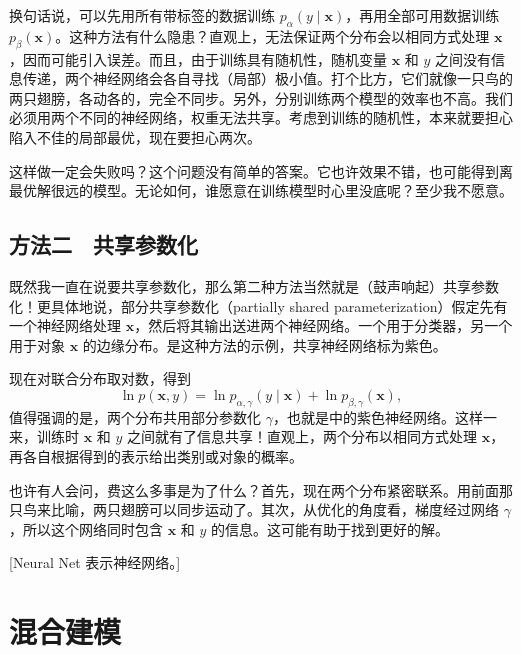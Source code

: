 换句话说，可以先用所有带标签的数据训练 $p_\alpha(y\mid\mathbf{x})$，再用全部可用数据训练 $p_\beta(\mathbf{x})$。这种方法有什么隐患？直观上，无法保证两个分布会以相同方式处理 $\mathbf{x}$，因而可能引入误差。而且，由于训练具有随机性，随机变量 $\mathbf{x}$ 和 $y$ 之间没有信息传递，两个神经网络会各自寻找（局部）极小值。打个比方，它们就像一只鸟的两只翅膀，各动各的，完全不同步。另外，分别训练两个模型的效率也不高。我们必须用两个不同的神经网络，权重无法共享。考虑到训练的随机性，本来就要担心陷入不佳的局部最优，现在要担心两次。

这样做一定会失败吗？这个问题没有简单的答案。它也许效果不错，也可能得到离最优解很远的模型。无论如何，谁愿意在训练模型时心里没底呢？至少我不愿意。

\subsection{方法二　共享参数化}

既然我一直在说要共享参数化，那么第二种方法当然就是（鼓声响起）共享参数化！更具体地说，部分共享参数化（partially shared parameterization）假定先有一个神经网络处理 $\mathbf{x}$，然后将其输出送进两个神经网络。一个用于分类器，另一个用于对象 $\mathbf{x}$ 的边缘分布。是这种方法的示例，共享神经网络标为紫色。

现在对联合分布取对数，得到
\begin{equation}
\ln p(\mathbf{x},y)=\ln p_{\alpha,\gamma}(y\mid\mathbf{x})+\ln p_{\beta,\gamma}(\mathbf{x}),
\tag{6.5}\label{eq:06-05}
\end{equation}
值得强调的是，两个分布共用部分参数化 $\gamma$，也就是中的紫色神经网络。这样一来，训练时 $\mathbf{x}$ 和 $y$ 之间就有了信息共享！直观上，两个分布以相同方式处理 $\mathbf{x}$，再各自根据得到的表示给出类别或对象的概率。

也许有人会问，费这么多事是为了什么？首先，现在两个分布紧密联系。用前面那只鸟来比喻，两只翅膀可以同步运动了。其次，从优化的角度看，梯度经过网络 $\gamma$，所以这个网络同时包含 $\mathbf{x}$ 和 $y$ 的信息。这可能有助于找到更好的解。

[Neural Net 表示神经网络。]

\section{混合建模}

